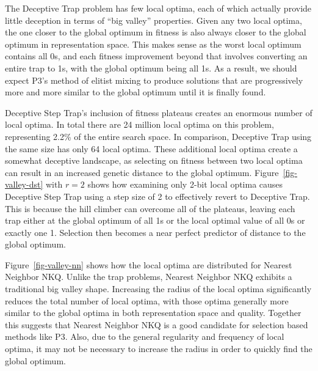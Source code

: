 The Deceptive Trap problem has few local optima, each of which actually
provide little deception in terms of ``big valley'' properties. Given any two local optima, the one
closer to the global optimum in fitness is also always closer to the global optimum in representation space.
This makes sense as the worst local optimum contains all 0s, and each fitness improvement beyond that involves
converting an entire trap to 1s, with the global optimum being all 1s. As a result, we should expect P3's method
of elitist mixing to produce solutions that are progressively more and more similar to the global optimum until
it is finally found.

Deceptive Step Trap's inclusion of fitness plateaus creates an enormous number of local optima. In total there are 24
million local optima on this problem, representing 2.2\% of the entire search space. In comparison, Deceptive Trap using the
same size has only 64 local optima. These additional local optima create a somewhat deceptive landscape, as selecting
on fitness between two local optima can result in an increased genetic distance to the global optimum.
Figure~\ref{fig-valley-dst} with $r=2$ shows how examining only 2-bit local optima causes Deceptive Step Trap using
a step size of 2 to effectively revert to Deceptive Trap. This is because the hill climber can overcome all of the plateaus,
leaving each trap either at the global optimum of all 1s or the local optimal value of all 0s or exactly one 1. Selection then
becomes a near perfect predictor of distance to the global optimum.

\begin{figure*}
  \centering
  \caption{Location and quality of local optima in comparison to the global optima for a representative Nearest Neighbor NKQ problem
           with $N=60$ and $k=2$.}
  \label{fig-valley-nn}
\end{figure*}

Figure~\ref{fig-valley-nn} shows how the local optima are distributed for Nearest Neighbor NKQ. Unlike the trap problems,
Nearest Neighbor NKQ exhibits a traditional big valley shape. Increasing the radius of the local optima significantly
reduces the total number of local optima, with those optima generally more similar to the global optima in both representation
space and quality. Together this suggests that Nearest Neighbor NKQ is a good candidate for selection based methods like P3. Also,
due to the general regularity and frequency of local optima, it may not be necessary to increase the radius in order to quickly find
the global optimum.

